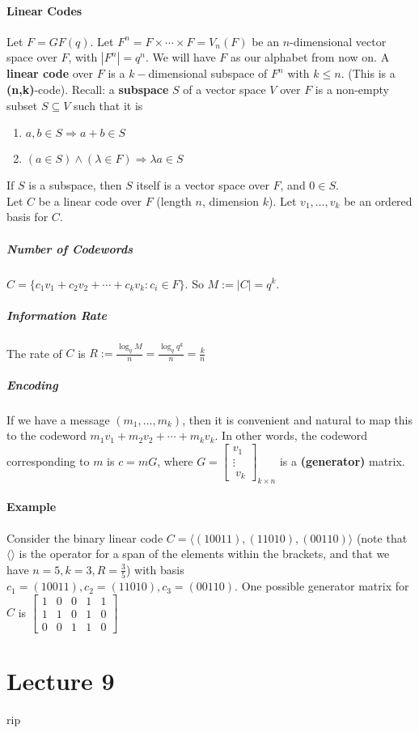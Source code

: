 \documentclass[10pt,letter]{article}
\theoremstyle{plain}
\theoremstyle{definition}
\begin{document}
\paragraph{Linear Codes}
Let $F=GF(q)$. Let $F^n=F\times\cdots\times F=V_n(F)$ be an $n$-dimensional vector space over $F$, with $|F^n|=q^n$. We will have $F$ as our alphabet from now on. A \textbf{linear code} over $F$ is a $k-$dimensional subspace of $F^n$ with $k\leq n$. (This is a \textbf{(n,k)}-code). Recall: a \textbf{subspace} $S$ of a vector space $V$ over $F$ is a non-empty subset $S\subseteq V$ such that it is \begin{enumerate}
    \item $a,b\in S\Rightarrow a+b\in S$ 
    \item $(a\in S)\wedge(\lambda\in F)\Rightarrow \lambda a\in S$
\end{enumerate}
If $S$ is a subspace, then $S$ itself is a vector space over $F$, and $0\in S$. 
\\ 
Let $C$ be a linear code over $F$ (length $n$, dimension $k$). Let $v_1,\ldots,v_k$ be an ordered basis for $C$. 
\subparagraph{Number of Codewords}
$C=\{c_1v_1+c_2v_2+\cdots+c_kv_k:c_i\in F\}$. So $M:=|C|=q^k$. 
\subparagraph{Information Rate} 
The rate of $C$ is $R:=\frac{\log_qM}{n}=\frac{\log_qq^k}{n}=\frac{k}{n}$ 
\subparagraph{Encoding}
If we have a message $(m_1,\ldots,m_k)$, then it is convenient and natural to map this to the codeword $m_1v_1+m_2v_2+\cdots+m_kv_k$. In other words, the codeword corresponding to $m$ is $c=mG$, where $G=\begin{bmatrix}v_1\\\vdots\\\ v_k\end{bmatrix}_{k\times n}$ is a \textbf{(generator)} matrix.
\paragraph{Example}
Consider the binary linear code $C=\langle(10011),(11010),(00110)\rangle$ (note that $\langle\rangle$ is the operator for a span of the elements within the brackets, and that we have $n=5,k=3,R=\frac{3}{5}$) with basis $c_1=(10011),c_2=(11010),c_3=(00110)$. One possible generator matrix for $C$ is $\begin{bmatrix}1&0&0&1&1\\1&1&0&1&0\\0&0&1&1&0\end{bmatrix}$

\section*{Lecture 9}
rip
\end{document}
